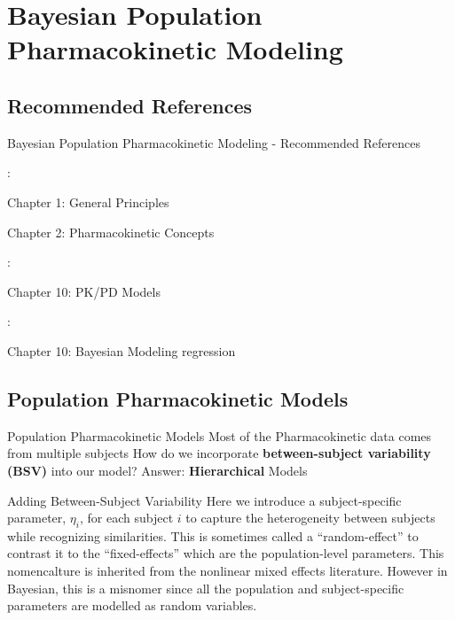 
\section{Bayesian Population Pharmacokinetic Modeling}

\subsection{Recommended References}
\begin{frame}{Bayesian Population Pharmacokinetic Modeling - Recommended References}
    \begin{vfilleditems}
        \item \textcite{Gabrielsson2006PKPDbook}:
        \begin{vfilleditems}
            \item Chapter 1: General Principles
            \item Chapter 2: Pharmacokinetic Concepts
        \end{vfilleditems}
        \item \textcite{Owen2014PKPDbook}:
        \begin{vfilleditems}
            \item Chapter 10: PK/PD Models
        \end{vfilleditems}
        \item \textcite{Bonate2011PKPDbook}:
        \begin{vfilleditems}
            \item Chapter 10: Bayesian Modeling regression
        \end{vfilleditems}
        \item \textcite{margossian2022torsten}
    \end{vfilleditems}
\end{frame}

\subsection{Population Pharmacokinetic Models}
\begin{frame}{Population Pharmacokinetic Models}
    Most of the Pharmacokinetic data comes from multiple subjects
    \vfill
    How do we incorporate \textbf{between-subject variability (BSV)} into our model?
    \vfill
    Answer: \textbf{Hierarchical} Models
\end{frame}

\begin{frame}{Adding Between-Subject Variability}
    Here we introduce a subject-specific parameter, $\eta_i$,
    for each subject $i$ to capture the heterogeneity between subjects
    while recognizing similarities.
    \vfill
    This is sometimes called a ``random-effect'' to contrast it to the ``fixed-effects'' which are the population-level parameters.
    \vfill
    This nomencalture is inherited from the nonlinear mixed effects literature.
    \vfill
    However in Bayesian, this is a misnomer since all the population and subject-specific parameters are modelled as random variables.
\end{frame}

